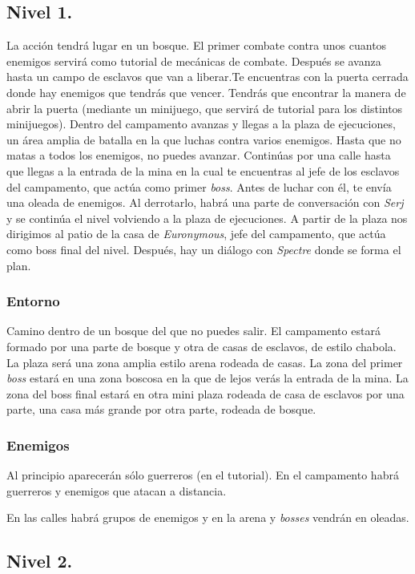 \documentclass[11pt, twoside]{article}
\begin{document}
\subsection{Nivel 1.}
La acción tendrá lugar en un bosque. El primer combate contra unos cuantos enemigos servirá como tutorial de mecánicas de combate. Después se avanza hasta un campo de esclavos que van a liberar.Te encuentras con la puerta cerrada donde hay enemigos que tendrás que vencer. Tendrás que encontrar la manera de abrir la puerta (mediante un minijuego, que servirá de tutorial para los distintos minijuegos). Dentro del campamento avanzas y llegas a la plaza de ejecuciones, un área amplia de batalla en la que luchas contra varios enemigos. Hasta que no matas a todos los enemigos, no puedes avanzar. Continúas por una calle hasta que llegas a la entrada de la mina en la cual te encuentras al jefe de los esclavos del campamento, que actúa como primer \textit{boss}. Antes de luchar con él, te envía una oleada de enemigos. Al derrotarlo, habrá una parte de conversación con \textit{Serj} y se continúa el nivel volviendo a la plaza de ejecuciones. A partir de la plaza nos dirigimos al patio de la casa de \textit{Euronymous}, jefe del campamento, que actúa como boss final del nivel. Después, hay un diálogo con \textit{Spectre} donde se forma el plan. 

\subsubsection{Entorno}
Camino dentro de un bosque del que no puedes salir. El campamento estará formado por una parte de bosque y otra de casas de esclavos, de estilo chabola.  La plaza será una zona amplia estilo arena rodeada de casas. La zona del primer \textit{boss} estará en una zona boscosa en la que de lejos verás la entrada de la mina. La zona del boss final estará en otra mini plaza rodeada de casa de esclavos por una parte, una casa más grande por otra parte, rodeada de bosque.

\subsubsection{Enemigos}
Al principio aparecerán sólo guerreros (en el tutorial). En el campamento habrá guerreros y enemigos que atacan a distancia. 

En las calles habrá grupos de enemigos y en la arena y \textit{bosses} vendrán en oleadas.

\subsection{Nivel 2.}
\end{document}
